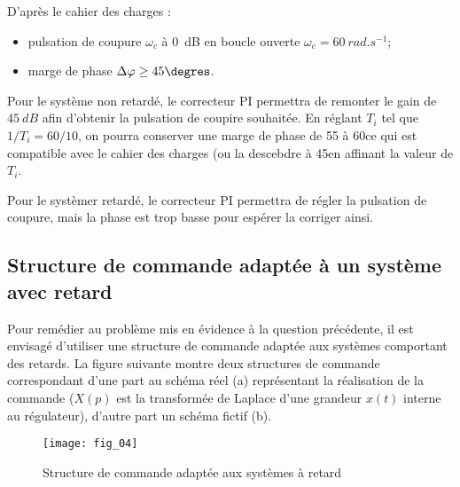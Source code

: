 \ifprof
\begin{corrige}
D'après le cahier des charges : 
\begin{itemize}
\item pulsation de coupure $\omega_c$ à \SI{0}{dB} en boucle ouverte $\omega_c = \SI{60}{rad.s^{-1}}$;
\item marge de phase $\Delta \varphi \geq 45 \degres$.
\end{itemize}

Pour le système non retardé, le correcteur PI permettra de remonter le gain de $\SI{45}{dB}$ afin d'obtenir la pulsation de coupire souhaitée. En réglant $T_i$ tel que $1/T_i = 60/10$, on pourra conserver une marge de phase de 55 à 60\degres ce qui est compatible avec le cahier des charges (ou la descebdre à 45\degres en affinant la valeur de $T_i$.


Pour le systèmer retardé, le correcteur PI permettra de régler la pulsation de coupure, mais la phase est trop basse pour espérer la corriger ainsi.  
\end{corrige}
\else
\fi


\subsection*{Structure de commande adaptée à un système avec retard}

\ifprof
\else
Pour remédier au problème mis en évidence à la question précédente, il est envisagé d’utiliser une structure de commande
adaptée aux systèmes comportant des retards. La figure suivante montre deux structures de commande correspondant
d’une part au schéma réel (a) représentant la réalisation de la commande ($X(p)$ est la transformée de Laplace
d’une grandeur $x(t)$ interne au régulateur), d’autre part un schéma fictif (b).

\begin{figure}[!h]
\texttt{[image: fig\_04]}
\caption{Structure de commande adaptée aux systèmes à retard}
\end{figure}
\fi


